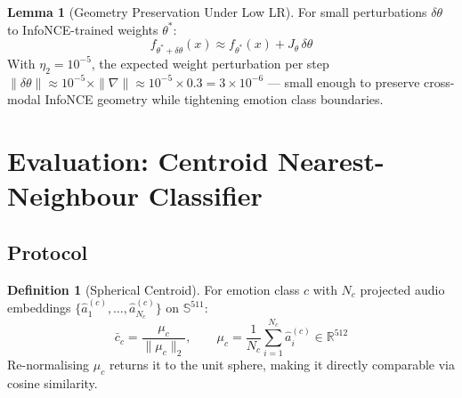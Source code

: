 \documentclass[12pt,a4paper]{article}
\theoremstyle{definition}
\newtheorem{lemma}[theorem]{Lemma}
\newtheorem{definition}[theorem]{Definition}
\theoremstyle{remark}
\begin{document}
\begin{lemma}[Geometry Preservation Under Low LR]
For small perturbations $\delta\theta$ to InfoNCE-trained weights $\theta^*$:
\[
  f_{\theta^* + \delta\theta}(x) \approx f_{\theta^*}(x) + J_\theta\,\delta\theta
\]
With $\eta_2 = 10^{-5}$, the expected weight perturbation per step
$\|\delta\theta\| \approx 10^{-5} \times \|\nabla\| \approx 10^{-5} \times 0.3 = 3 \times 10^{-6}$
— small enough to preserve cross-modal InfoNCE geometry
while tightening emotion class boundaries.
\end{lemma}

\section{Evaluation: Centroid Nearest-Neighbour Classifier}

\subsection{Protocol}

\begin{definition}[Spherical Centroid]
For emotion class $c$ with $N_c$ projected audio embeddings
$\{\hat{a}_1^{(c)}, \ldots, \hat{a}_{N_c}^{(c)}\}$ on $\mathbb{S}^{511}$:
\[
  \bar{c}_c = \frac{\mu_c}{\|\mu_c\|_2}, \qquad
  \mu_c = \frac{1}{N_c}\sum_{i=1}^{N_c} \hat{a}_i^{(c)} \in \mathbb{R}^{512}
\]
Re-normalising $\mu_c$ returns it to the unit sphere, making it
directly comparable via cosine similarity.
\end{definition}
\end{document}
